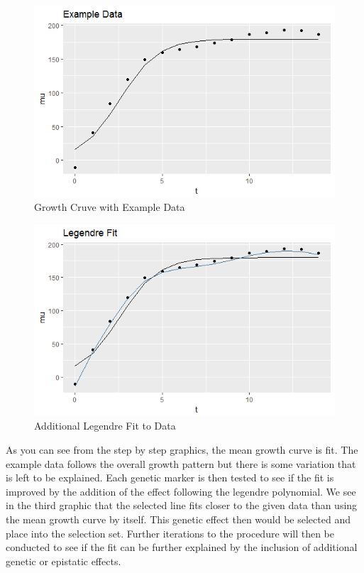 \documentclass[11pt,]{book}
\theoremstyle{definition}
\theoremstyle{definition}
\theoremstyle{remark}
\begin{document}
\begin{figure}

{\centering \includegraphics[width=0.8\linewidth]{images/ExampleDataGrowthCurve} 

}

\caption{Growth Cruve with Example Data}\label{fig:growth-exampledata}
\end{figure}

\begin{figure}

{\centering \includegraphics[width=0.8\linewidth]{images/LegendreFit} 

}

\caption{Additional Legendre Fit to Data}\label{fig:legendre-fit}
\end{figure}

As you can see from the step by step graphics, the mean growth curve is
fit. The example data follows the overall growth pattern but there is
some variation that is left to be explained. Each genetic marker is then
tested to see if the fit is improved by the addition of the effect
following the legendre polynomial. We see in the third graphic that the
selected line fits closer to the given data than using the mean growth
curve by itself. This genetic effect then would be selected and place
into the selection set. Further iterations to the procedure will then be
conducted to see if the fit can be further explained by the inclusion of
additional genetic or epistatic effects.
\end{document}
